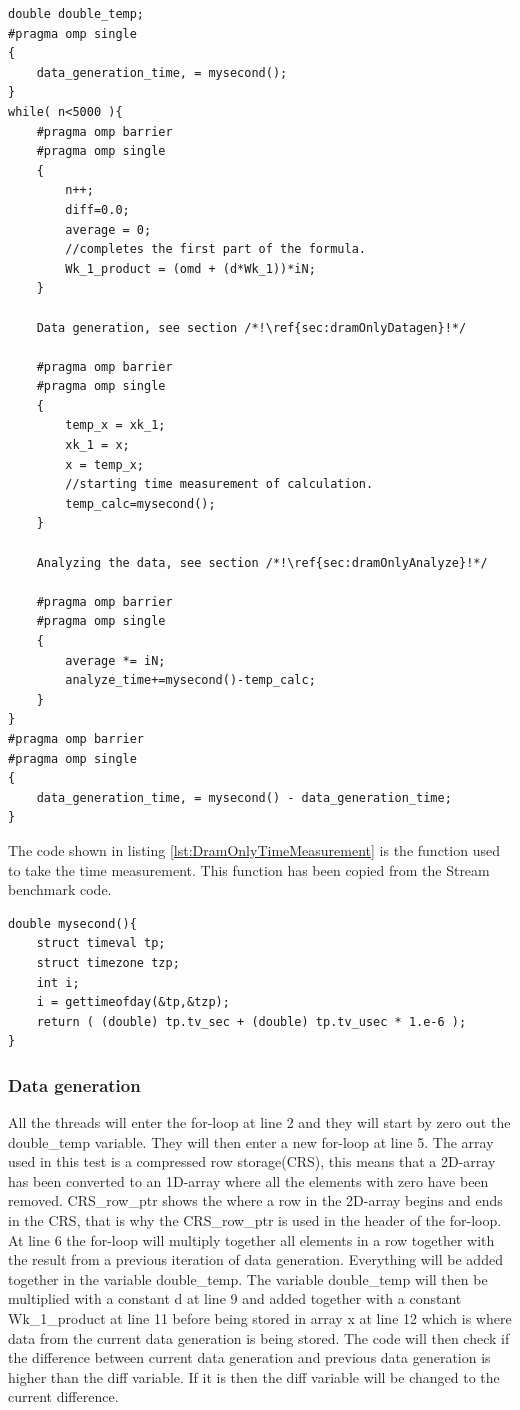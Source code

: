 \documentclass[12pt,a4paper,USenglish]{article}      %
\begin{document}
\begin{lstlisting}[caption={DRAM only version of the simulation code.},escapeinside={{/*!}{!*/}}, label={lst:DramOnlyMain}]
double double_temp;
#pragma omp single
{
	data_generation_time, = mysecond();
}
while( n<5000 ){
	#pragma omp barrier
	#pragma omp single
	{
		n++;
		diff=0.0;
		average = 0;
		//completes the first part of the formula.
		Wk_1_product = (omd + (d*Wk_1))*iN;
	}
	
	Data generation, see section /*!\ref{sec:dramOnlyDatagen}!*/
	
	#pragma omp barrier
	#pragma omp single
	{
		temp_x = xk_1;
		xk_1 = x;
		x = temp_x;
		//starting time measurement of calculation.
		temp_calc=mysecond();
	}
	
	Analyzing the data, see section /*!\ref{sec:dramOnlyAnalyze}!*/
	
	#pragma omp barrier
	#pragma omp single
	{
		average *= iN;
		analyze_time+=mysecond()-temp_calc;
	}
}
#pragma omp barrier
#pragma omp single
{
	data_generation_time, = mysecond() - data_generation_time;
}
\end{lstlisting}
The code shown in listing \ref{lst:DramOnlyTimeMeasurement} is the function used to take the time measurement. This function has been copied from the Stream benchmark code. 
\begin{lstlisting}[caption={Function that that is used for measure time},escapeinside={{/*!}{!*/}}, label={lst:DramOnlyTimeMeasurement}]
double mysecond(){
	struct timeval tp;
	struct timezone tzp;
	int i;
	i = gettimeofday(&tp,&tzp);
	return ( (double) tp.tv_sec + (double) tp.tv_usec * 1.e-6 );
}
\end{lstlisting}
\subsubsection{Data generation}
\label{sec:dramOnlyDatagen}
All the threads will enter the for-loop at line 2 and they will start by zero out the double\_temp variable. They will then enter a new for-loop at line 5.
The array used in this test is a compressed row storage(CRS), this means that a 2D-array has been converted to an 1D-array where all the elements with zero have been removed. CRS\_row\_ptr shows the where a row in the 2D-array begins and ends in the CRS, that is why the CRS\_row\_ptr is used in the header of the for-loop. At line 6 the for-loop will multiply together all elements in a row together with the result from a previous iteration of data generation. 
Everything will be added together in the variable double\_temp. The variable double\_temp will then be multiplied with a constant d at line 9 and added together with a constant Wk\_1\_product at line 11 before being stored in array x at line 12 which is where data from the current data generation is being stored.
The code will then check if the difference between current data generation and previous data generation is higher than the diff variable. If it is then the diff variable will be changed to the current difference.
\end{document}
